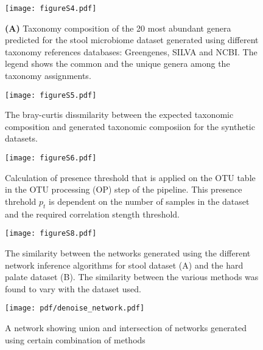   \begin{figure}[h]
    \centering
    \texttt{[image: figureS4.pdf]}
    \caption{
      \textbf{(A)} Taxonomy composition of the 20 most abundant genera predicted for the stool microbiome dataset generated using different taxonomy references databases: Greengenes, SILVA and NCBI.
      The legend shows the common and the unique genera among the taxonomy assignments.
  }
    \label{fig:figureS4}
  \end{figure}

  \begin{figure}[h]
    \centering
    \texttt{[image: figureS5.pdf]}
    \caption{
      The bray-curtis dissmilarity between the expected taxonomic composition and generated taxonomic composiion for the synthetic datasets.
  }
  \label{fig:figureS5}
  \end{figure}

  \begin{figure}[h]
    \centering
    \texttt{[image: figureS6.pdf]}
    \caption{
      Calculation of presence threshold that is applied on the OTU table in the OTU processing (OP) step of the pipeline.
      This presence threhold $p_t$ is dependent on the number of samples in the dataset and the required correlation stength threshold.
  }
    \label{fig:figureS6}
  \end{figure}

  \begin{figure}[h]
    \centering
    \texttt{[image: figureS8.pdf]}
    \caption{
      The similarity between the networks generated using the different network inference algorithms for stool dataset (A) and the hard palate dataset (B).
      The similarity between the various methods was found to vary with the dataset used.
  }
    \label{fig:figureS8}
  \end{figure}

  \begin{figure}[h]
    \centering
    \texttt{[image: pdf/denoise\_network.pdf]}
    \caption{A network showing union and intersection of networks generated using certain combination of methods}
    \label{fig:figureS5}
  \end{figure}
